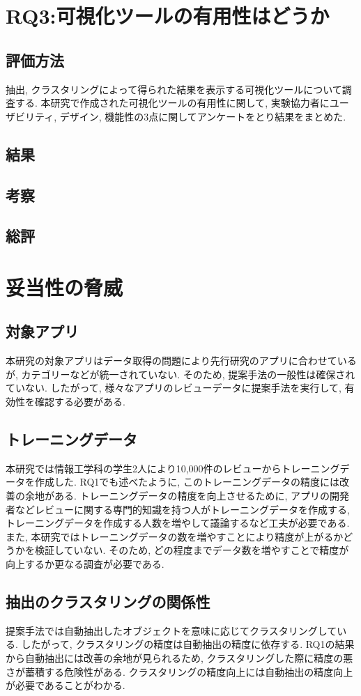 

\section{RQ3:可視化ツールの有用性はどうか}
\subsection{評価方法}
抽出, クラスタリングによって得られた結果を表示する可視化ツールについて調査する. 本研究で作成された可視化ツールの有用性に関して, 実験協力者にユーザビリティ, デザイン, 機能性の3点に関してアンケートをとり結果をまとめた. 

\subsection{結果}

\subsection{考察}

\subsection{総評}

\section{妥当性の脅威}
\subsection{対象アプリ}
本研究の対象アプリはデータ取得の問題により先行研究のアプリに合わせているが, カテゴリーなどが統一されていない. そのため, 提案手法の一般性は確保されていない. 
したがって, 様々なアプリのレビューデータに提案手法を実行して, 有効性を確認する必要がある. 

\subsection{トレーニングデータ}
本研究では情報工学科の学生2人により10,000件のレビューからトレーニングデータを作成した. RQ1でも述べたように, このトレーニングデータの精度には改善の余地がある. 
トレーニングデータの精度を向上させるために, アプリの開発者などレビューに関する専門的知識を持つ人がトレーニングデータを作成する, トレーニングデータを作成する人数を増やして議論するなど工夫が必要である. 
また, 本研究ではトレーニングデータの数を増やすことにより精度が上がるかどうかを検証していない. そのため, どの程度までデータ数を増やすことで精度が向上するか更なる調査が必要である. 

\subsection{抽出のクラスタリングの関係性}
提案手法では自動抽出したオブジェクトを意味に応じてクラスタリングしている. したがって, クラスタリングの精度は自動抽出の精度に依存する. 
RQ1の結果から自動抽出には改善の余地が見られるため, クラスタリングした際に精度の悪さが蓄積する危険性がある. クラスタリングの精度向上には自動抽出の精度向上が必要であることがわかる. 